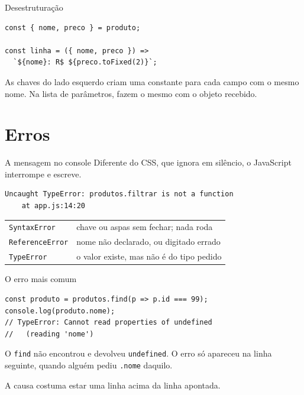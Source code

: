 \documentclass{beamer}
\begin{document}
\begin{frame}[fragile]{Desestruturação}
	\begin{verbatim}
const { nome, preco } = produto;

const linha = ({ nome, preco }) =>
  `${nome}: R$ ${preco.toFixed(2)}`;
	\end{verbatim}

	\vspace{0.3cm}
	As chaves do lado esquerdo criam uma constante para cada campo com o mesmo
	nome. Na lista de parâmetros, fazem o mesmo com o objeto recebido.
\end{frame}

\section{Erros}

\begin{frame}[fragile]{A mensagem no console}
	Diferente do CSS, que ignora em silêncio, o JavaScript interrompe e escreve.

	\begin{verbatim}
Uncaught TypeError: produtos.filtrar is not a function
    at app.js:14:20
	\end{verbatim}

	\vspace{0.3cm}
	\begin{tabular}{ll}
		\toprule
		\texttt{SyntaxError}    & chave ou aspas sem fechar; nada roda \\
		\texttt{ReferenceError} & nome não declarado, ou digitado errado \\
		\texttt{TypeError}      & o valor existe, mas não é do tipo pedido \\
		\bottomrule
	\end{tabular}
\end{frame}

\begin{frame}[fragile]{O erro mais comum}
	\begin{verbatim}
const produto = produtos.find(p => p.id === 99);
console.log(produto.nome);
// TypeError: Cannot read properties of undefined
//   (reading 'nome')
	\end{verbatim}

	\vspace{0.3cm}
	O \texttt{find} não encontrou e devolveu \texttt{undefined}. O erro só
	apareceu na linha seguinte, quando alguém pediu \texttt{.nome} daquilo.

	\vspace{0.3cm}
	A causa costuma estar uma linha acima da linha apontada.
\end{frame}
\end{document}

